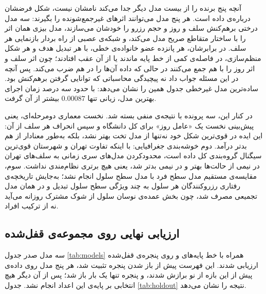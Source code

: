 آنچه پنج برنده را از بیست مدل دیگر جدا می‌کند نامشان نیست، شکل فرضشان درباره‌ی داده
است. هر پنج مدل می‌توانند اثرهای غیرجمع‌شونده را بگیرند: سه مدل درختی برهم‌کنش سلف و
روز و حجم رزرو را خودشان می‌سازند، مدل بیزی همان اثر را با ساختار متقاطع صریح مدل
می‌کند، و شبکه‌ی عصبی از راه بردار بازنمایی هر سلف. در برابرشان، هر پانزده عضو
خانواده‌ی خطی، با هر تبدیل هدف و هر شکل منظم‌سازی، در فاصله‌ی کمی از خط پایه ماندند یا
از آن عقب افتادند؛ چون اثر سلف و اثر روز را با هم جمع می‌کنند در حالی که داده آن‌ها را
در هم ضرب می‌کند. پس آنچه در این مسئله جواب داد نه پیچیدگی محاسباتی که توانایی گرفتن
برهم‌کنش بود. ساده‌ترین مدل غیرخطی جدول همین را نشان می‌دهد:
 با حدود سه درصد زمان اجرای بهترین مدل، زیانی تنها
$0.00087$ بیشتر از آن گرفت.

در کنار این، سه پرونده با نتیجه‌ی منفی بسته شد. نخست
معماری دومرحله‌ای، یعنی پیش‌بینی نخست یک «عامل روز» برای کل دانشگاه و سپس انحراف هر
سلف از آن: این ایده در قوی‌ترین شکل خود نه‌تنها از مدل تخت بهتر نشد، بلکه به‌طور معنادار
از  هم بدتر درآمد. دوم خوشه‌بندی جغرافیایی: با اینکه تفاوت تهران و شهرستان
قوی‌ترین سیگنال گروه‌بندی کل داده است، محدودکردن مدل‌های سری زمانی به سلف‌های تهران در
نیمی از حالت‌ها بهتر و در نیمی بدتر شد، یعنی هیچ برتری نظام‌مندی نداشت. سوم، مقایسه‌ی
مستقیم مدل سطح فرد با مدل سطح سلول انجام نشد؛ به‌جایش تاریخچه‌ی رفتاری رزروکنندگان هر
سلول به چند ویژگی سطح سلول تبدیل و در همان مدل تجمیعی مصرف شد، چون بخش عمده‌ی نوسان
سلول از شوک مشترک روزانه می‌آید نه از ترکیب افراد.

\subsection{ارزیابی نهایی روی مجموعه‌ی قفل‌شده}
\label{sec:4-4-2}

سه مدل صدر جدول \ref{tab:models} همراه با خط پایه‌های  و  روی پنجره‌ی
قفل‌شده ارزیابی شدند. این فهرست پیش از باز شدن پنجره تثبیت شد، هر پنج مدل روی داده‌ی
پیش از این بازه از نو برازش شدند، و پنجره تنها یک بار باز شد؛ پس از آن دیگر هیچ انتخابی
بر پایه‌ی این اعداد انجام نشد. جدول \ref{tab:holdout} نتیجه را نشان می‌دهد.

